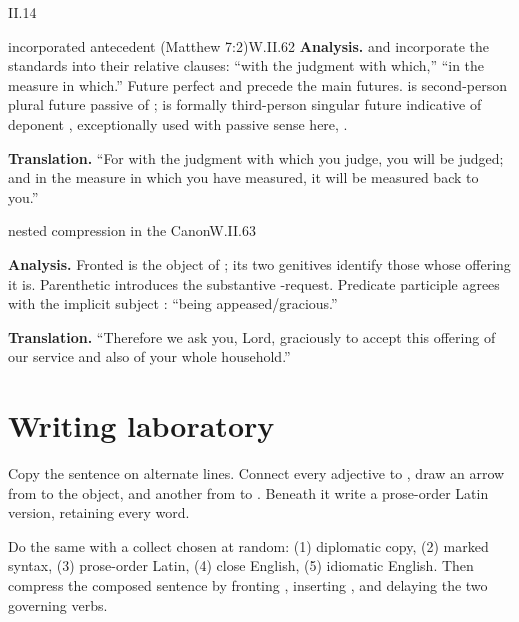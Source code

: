 \begin{courseunit}{II.14}
\begin{workedexample}{incorporated antecedent (Matthew 7:2)}{W.II.62}
\textbf{Analysis.}   and  incorporate the standards
into their relative clauses: ``with the judgment with which,'' ``in the measure in which.''
Future perfect  and  precede the
main futures.  is second-person plural future passive of
;  is formally third-person singular future
indicative of deponent , exceptionally
used with passive sense here, .

\textbf{Translation.}  ``For with the judgment with which you judge, you will be judged; and
in the measure in which you have measured, it will be measured back to you.''
\end{workedexample}

\begin{workedexample}{nested compression in the Canon}{W.II.63}

\textbf{Analysis.}  Fronted  is the object of ; its two
genitives identify those whose offering it is.  Parenthetic  introduces the
substantive -request.  Predicate participle
 agrees with the implicit subject : ``being appeased/gracious.''

\textbf{Translation.}  ``Therefore we ask you, Lord, graciously to accept this offering of our
service and also of your whole household.''
\end{workedexample}

\section{Writing laboratory}

Copy the  sentence on alternate lines.  Connect every adjective to
, draw an arrow from  to the object, and another from
 to .  Beneath it write a prose-order Latin version, retaining
every word.

Do the same with a collect chosen at random: (1) diplomatic copy, (2) marked syntax,
(3) prose-order Latin, (4) close English, (5) idiomatic English.  Then compress the composed
sentence  by fronting
, inserting , and delaying the two governing verbs.

\end{courseunit}
